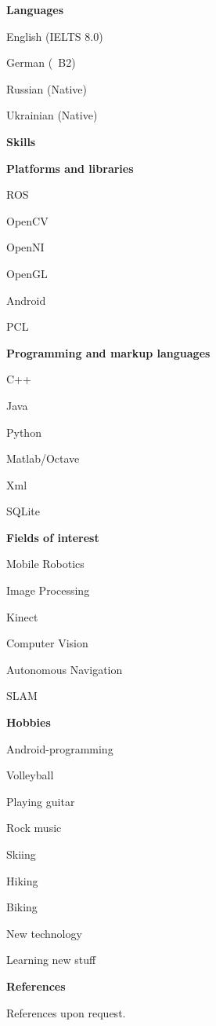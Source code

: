 \documentclass[a4paper,12pt,final]{memoir}
\newcommand{\Sep}{\vspace{1.5em}}
\newcommand{\SmallSep}{\vspace{0.5em}}
\newcommand{\CVSection}[1]
	{\Large\textbf{#1}\par
	\SmallSep\normalsize\normalfont}
\newcommand{\CVItem}[1]
	{\textbf{\color{MidnightBlue} #1}}
\begin{document}
\CVSection{Languages}
\begin{compactitem}[\color{MidnightBlue}$\circ$]
	\item English (IELTS 8.0)
	\item German (~B2) 
	\item Russian (Native) 
	\item Ukrainian (Native)
\end{compactitem}
\Sep
\CVSection{Skills}
\CVItem{Platforms and libraries}
\begin{multicols}{3}
\begin{compactitem}[\color{MidnightBlue}$\circ$]
	\item ROS 
	\item OpenCV
	\item OpenNI 
	\item OpenGL
	\item Android
	\item PCL
\end{compactitem}
\end{multicols}
\SmallSep

\CVItem{Programming and markup languages}
\begin{multicols}{3}
\begin{compactitem}[\color{MidnightBlue}$\circ$]
	\item C++ 
	\item Java 
	\item Python 
	\item Matlab/Octave 
	\item Xml
	\item SQLite
\end{compactitem}
\end{multicols}
\SmallSep

\CVItem{Fields of interest}
\begin{compactitem}[\color{MidnightBlue}$\circ$]
	\item Mobile Robotics
	\item Image Processing 
	\item Kinect 
	\item Computer Vision 
	\item Autonomous Navigation
	\item SLAM
\end{compactitem}
\Sep 

\CVSection{Hobbies}
\begin{compactitem}[\color{MidnightBlue}$\circ$]
	\item Android-programming
	\item Volleyball
	\item Playing guitar 
	\item Rock music
	\item Skiing
	\item Hiking
	\item Biking
	\item New technology
	\item Learning new stuff
\end{compactitem}
\Sep

\CVSection{References}
References upon request.

\end{document}

